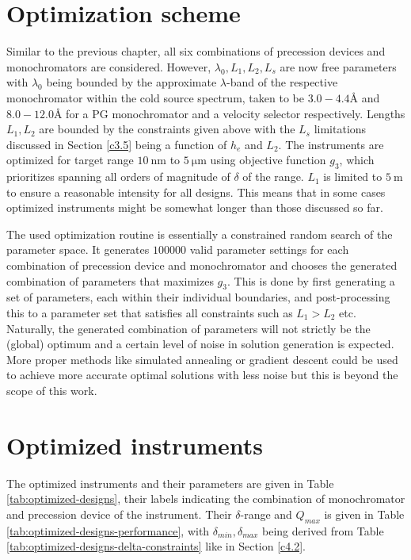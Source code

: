 \section{Optimization scheme}
\label{c5.3}
Similar to the previous chapter, all six combinations of precession devices and monochromators are considered. However, $\lambda_0, L_1, L_2, L_s$ are now free parameters with $\lambda_0$ being bounded by the approximate $\lambda$-band of the respective monochromator within the cold source spectrum, taken to be $3.0 - 4.4$Å and $8.0 - 12.0$Å for a PG monochromator and a velocity selector respectively. Lengths $L_1, L_2$ are bounded by the constraints given above with the $L_s$ limitations discussed in Section \ref{c3.5} being a function of $h_e$ and $L_2$. 
The instruments are optimized for target range $\SI{10}{\nano\meter}$ to $\SI{5}{\micro\meter}$ using objective function $g_3$, which prioritizes spanning all orders of magnitude of $\delta$ of the range. $L_1$ is limited to $\SI{5}{\meter}$ to ensure a reasonable intensity for all designs. This means that in some cases optimized instruments might be somewhat longer than those discussed so far. 

The used optimization routine is essentially a constrained random search of the parameter space. It generates $100000$ valid parameter settings for each combination of precession device and monochromator and chooses the generated combination of parameters that maximizes $g_3$. This is done by first generating a set of parameters, each within their individual boundaries, and post-processing this to a parameter set that satisfies all constraints such as $L_1>L_2$ etc. Naturally, the generated combination of parameters will not strictly be the (global) optimum and a certain level of noise in solution generation is expected. More proper methods like simulated annealing or gradient descent could be used to achieve more accurate optimal solutions with less noise but this is beyond the scope of this work.

\section{Optimized instruments}
The optimized instruments and their parameters are given in Table \ref{tab:optimized-designs}, their labels indicating the combination of monochromator and precession device of the instrument. Their $\delta$-range and $Q_{max}$ is given in Table \ref{tab:optimized-designs-performance}, with $\delta_{min}, \delta_{max}$ being derived from Table \ref{tab:optimized-designs-delta-constraints} like in Section \ref{c4.2}.

